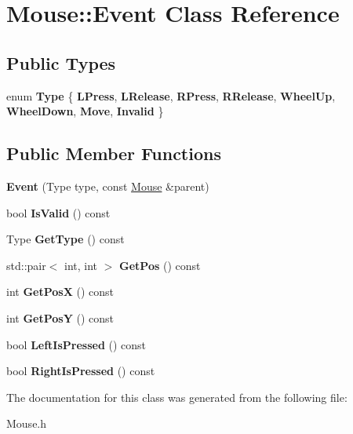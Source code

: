 \hypertarget{class_mouse_1_1_event}{}\section{Mouse\+:\+:Event Class Reference}
\label{class_mouse_1_1_event}
\subsection*{Public Types}
\begin{DoxyCompactItemize}
\item 
\mbox{\label{class_mouse_1_1_event_a32491602b4d05d2c0602db8e1e01686f}} 
enum {\bfseries Type} \{ \newline
{\bfseries L\+Press}, 
{\bfseries L\+Release}, 
{\bfseries R\+Press}, 
{\bfseries R\+Release}, 
\newline
{\bfseries Wheel\+Up}, 
{\bfseries Wheel\+Down}, 
{\bfseries Move}, 
{\bfseries Invalid}
 \}
\end{DoxyCompactItemize}
\subsection*{Public Member Functions}
\begin{DoxyCompactItemize}
\item 
\mbox{\label{class_mouse_1_1_event_aea4f1facdefa1854fe3c72d4902b0bee}} 
{\bfseries Event} (Type type, const \hyperlink{class_mouse}{Mouse} \&parent)
\item 
\mbox{\label{class_mouse_1_1_event_af11f64f339135a49c06c174a8fd2e3dc}} 
bool {\bfseries Is\+Valid} () const
\item 
\mbox{\label{class_mouse_1_1_event_a3f75592ce8c5bf94d5404f17df3784f8}} 
Type {\bfseries Get\+Type} () const
\item 
\mbox{\label{class_mouse_1_1_event_a9e6754c38abf6dc80c77a6fc5d4539b5}} 
std\+::pair$<$ int, int $>$ {\bfseries Get\+Pos} () const
\item 
\mbox{\label{class_mouse_1_1_event_a863eb1934b554fb081c90c9b1b28b4d6}} 
int {\bfseries Get\+PosX} () const
\item 
\mbox{\label{class_mouse_1_1_event_a85460659bdc08b0e1fe9bcd6d4c7d0a3}} 
int {\bfseries Get\+PosY} () const
\item 
\mbox{\label{class_mouse_1_1_event_aa03f692d57d82f23f9e2fb7cbeb508d2}} 
bool {\bfseries Left\+Is\+Pressed} () const
\item 
\mbox{\label{class_mouse_1_1_event_ab7a5f5d163e0d59141d23ddc8469d94e}} 
bool {\bfseries Right\+Is\+Pressed} () const
\end{DoxyCompactItemize}


The documentation for this class was generated from the following file\+:\begin{DoxyCompactItemize}
\item 
Mouse.\+h\end{DoxyCompactItemize}
